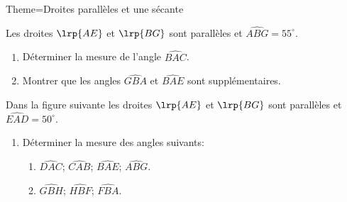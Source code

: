 \documentclass[a4paper,12pt]{article}
\begin{document}
\begin{Maquette}[Fiche]{Theme=Droites parallèles et une sécante}

\begin{exercice}%
\begin{minipage}{0.6\linewidth}
Les droites $\lrp{AE}$ et $\lrp{BG}$ sont parallèles et $\widehat{ABG}=55^{\circ}$.
\begin{enumerate}
\item Déterminer la mesure de l'angle $\widehat{BAC}$.
\item Montrer que les angles $\widehat{GBA}$ et $\widehat{BAE}$ sont supplémentaires.
\end{enumerate}
\end{minipage}%
\begin{minipage}{0.4\linewidth}
\end{minipage}
\end{exercice}

\begin{exercice}
\begin{minipage}{0.65\linewidth}
Dans la figure suivante les droites $\lrp{AE}$ et $\lrp{BG}$ sont parallèles et $\widehat{EAD}=50^{\circ}$.
\begin{enumerate}
\item Déterminer la mesure des angles suivants:
\begin{enumerate}
\item  $\widehat{DAC}$; $\widehat{CAB}$; $\widehat{BAE}$; $\widehat{ABG}$.
\item  $\widehat{GBH}$; $\widehat{HBF}$; $\widehat{FBA}$.
\end{enumerate}
\end{enumerate}
\end{minipage}%
\begin{minipage}{0.35\linewidth}
\end{minipage}
\end{exercice}


\end{Maquette}
\end{document}
